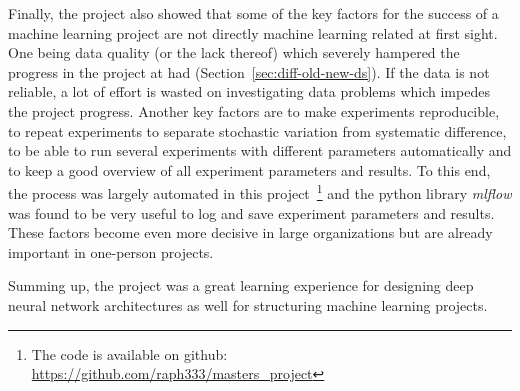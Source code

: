 Finally, the project also showed that some of the key factors for the success of a machine learning project are not directly machine learning related at first sight. One being data quality (or the lack thereof) which severely hampered the progress in the project at had (Section~\ref{sec:diff-old-new-ds}). If the data is not reliable, a lot of effort is wasted on investigating data problems which impedes the project progress. Another key factors are to make experiments reproducible, to repeat experiments to separate stochastic variation from systematic difference, to be able to run several experiments with different parameters automatically and to keep a good overview of all experiment parameters and results. To this end, the process was largely automated in this project~\footnote{The code is available on github: \url{https://github.com/raph333/masters_project}} and the python library \textit{mlflow} was found to be very useful to log and save experiment parameters and results. These factors become even more decisive in large organizations but are already important in one-person projects.

Summing up, the project was a great learning experience for designing deep neural network architectures as well for structuring machine learning projects.